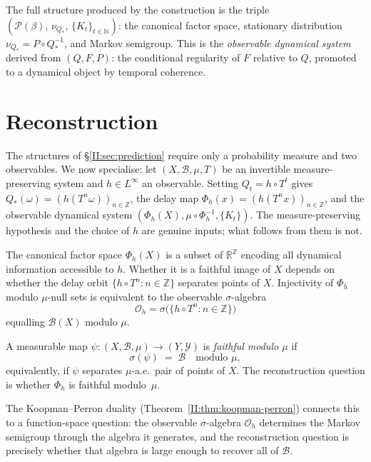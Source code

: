 The full structure produced by the construction is the triple
$(\mathcal{P}(\beta),\, \nu_{Q_*},\, \{K_t\}_{t \in \mathbb{N}})$:
the canonical factor space, stationary distribution $\nu_{Q_*} = P \circ Q_*^{-1}$,
and Markov semigroup.  This is the \emph{observable dynamical system}
derived from $(Q, F, P)$: the conditional regularity of $F$ relative to $Q$,
promoted to a dynamical object by temporal coherence.

\section{Reconstruction}
\label{II:sec:reconstruction}

The structures of §\ref{II:sec:prediction} require only a probability
measure and two observables.  We now specialise: let
$(X, \mathcal{B}, \mu, T)$ be an invertible measure-preserving system and
$h \in L^\infty$ an observable.  Setting $Q_t = h \circ T^t$ gives
$Q_*(\omega) = (h(T^n \omega))_{n \in \mathbb{Z}}$, the delay map
$\Phi_h(x) = (h(T^n x))_{n \in \mathbb{Z}}$, and the observable
dynamical system $(\Phi_h(X), \mu \circ \Phi_h^{-1}, \{K_t\})$.
The measure-preserving hypothesis and the choice of $h$ are genuine
inputs; what follows from them is not.

The canonical factor space $\Phi_h(X)$ is a subset of $\mathbb{R}^\mathbb{Z}$
encoding all dynamical information accessible to $h$.  Whether it is a faithful
image of $X$ depends on whether the delay orbit
$\{h \circ T^n : n \in \mathbb{Z}\}$ separates points of $X$.
Injectivity of $\Phi_h$ modulo $\mu$-null sets is equivalent to the observable
$\sigma$-algebra
\[
  \mathcal{O}_h = \sigma\!\bigl(\{h \circ T^n : n \in \mathbb{Z}\}\bigr)
\]
equalling $\mathcal{B}(X)$ modulo $\mu$.

\begin{definition}
\label{II:def:faithful}
A measurable map $\psi : (X, \mathcal{B}, \mu) \to (Y, \mathcal{Y})$ is
\emph{faithful modulo $\mu$} if
\[
  \sigma(\psi) \;=\; \mathcal{B} \quad \text{modulo } \mu,
\]
equivalently, if $\psi$ separates $\mu$-a.e.\ pair of points of $X$.
The reconstruction question is whether $\Phi_h$ is faithful modulo~$\mu$.
\end{definition}

The Koopman--Perron duality (Theorem~\ref{II:thm:koopman-perron}) connects this to a
function-space question: the observable $\sigma$-algebra $\mathcal{O}_h$ determines
the Markov semigroup through the algebra it generates, and the reconstruction question
is precisely whether that algebra is large enough to recover all of $\mathcal{B}$.


